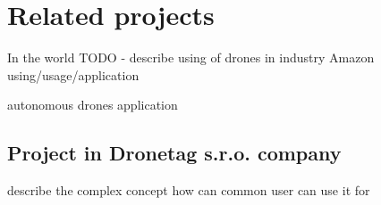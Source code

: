 \chapter{Related projects}\label{ch:related-projects}

In the world TODO - describe using of drones in industry
Amazon using/usage/application

autonomous drones application

\section{Project in Dronetag s.r.o. company}\label{sec:project-in-dronetag-s.r.o.-company}
describe the complex concept how can common user can use it for
